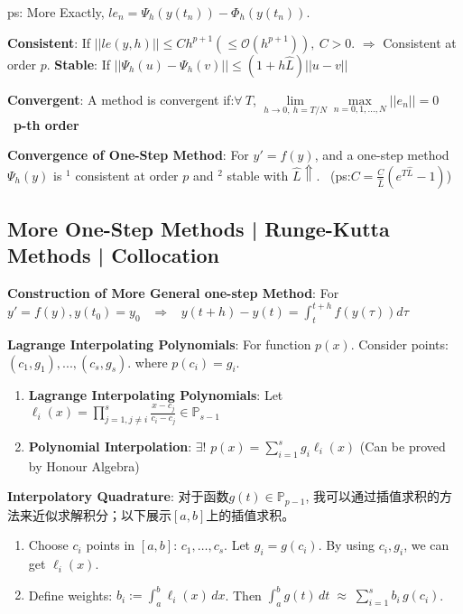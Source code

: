 \documentclass[9pt]{article}
\begin{document}
ps: More Exactly, $le_n=\Psi_h(y(t_n))-\Phi_h(y(t_n))$.

\textbf{Consistent}: {\small If $||le(y,h)||\leq Ch^{p+1} (\leq \mathcal{O}(h^{p+1})), \ C>0$. $\Rightarrow$ Consistent at order $p$.} \quad \textbf{Stable}: If $||\Psi_h(u)-\Psi_h(v)||\leq(1+h\widehat{L})||u-v||$

\textbf{Convergent}: {\small A method is convergent if:$\forall \ T$, $\lim\limits_{h\to0,\ h=T/N}\max\limits_{n=0,1,...,N}||e_n||=0$} \quad \quad {} \ {\tiny \textbf{p-th order}}

\vspace{-2pt}
\textbf{Convergence of One-Step Method}: {\small For $y'=f(y)$, and a one-step method $\Psi_h(y)$ is $^1$ consistent at order $p$ and $^2$ stable with $\widehat{L}\Uparrow$.} \ {\tiny (ps:$C=\frac{C}{\widehat{L}}(e^{T\widehat{L}}-1)$)}


\subsection{More One-Step Methods | Runge-Kutta Methods | Collocation} %

\textbf{Construction of More General one-step Method}: For $y'=f(y),y(t_0)=y_0$ \ $\Rightarrow$ \ $y(t+h)-y(t)=\int^{t+h}_tf(y(\tau))d\tau$

\textbf{Lagrange Interpolating Polynomials}: For function $p(x)$. Consider points: $(c_1,g_1),...,(c_s,g_s)$. where $p(c_i)=g_i$.

\begin{enumerate}[itemsep=-2pt, topsep=-1pt]
    \item \textbf{Lagrange Interpolating Polynomials}: Let $\ell_{i}(x)=\prod_{j=1,j\ne i}^{s}\frac{x-c_j}{c_i-c_j}\in\mathbb{P}_{s-1}$
    \item \textbf{Polynomial Interpolation}: $\exists!$ $p(x)=\sum_{i=1}^{s}g_i\ell_i(x)$ {\tiny (Can be proved by Honour Algebra)}
\end{enumerate}

\vspace{1pt}
\textbf{Interpolatory Quadrature}: {\footnotesize 对于函数$g(t)\in\mathbb{P}_{p-1}$, 我可以通过插值求积的方法来近似求解积分；以下展示$[a,b]$上的插值求积。}

\begin{enumerate}[itemsep=-2pt, topsep=-1pt]
    \item Choose $c_i$ points in $[a,b]$: $c_1,\dots,c_s$. \quad Let $g_i = g(c_i)$. \quad By using $c_i,g_i$, we can get $\ell_i(x)$.
    \item Define weights: $b_i := \int_a^b \ell_i(x)\,dx$. \quad Then $\int_a^b g(t)\,dt \;\approx\;\sum_{i=1}^{s} b_i\,g(c_i)$.
\end{enumerate}
\end{document}
